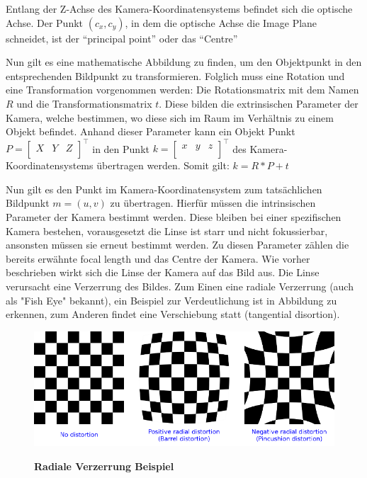 Entlang der Z-Achse des Kamera-Koordinatensystems befindet sich die optische Achse. Der Punkt $(c_x,c_y)$, in dem die optische Achse die Image Plane schneidet, ist der "`principal point"' oder das "`Centre"' \autocite[8]{Medioni:2004:ETC:993884}

Nun gilt es eine mathematische Abbildung zu finden, um den Objektpunkt in den entsprechenden Bildpunkt zu transformieren. Folglich muss eine Rotation und eine Transformation vorgenommen werden:
Die Rotationsmatrix mit dem Namen $R$ und die Transformationsmatrix $t$. Diese bilden die extrinsischen Parameter der Kamera, welche bestimmen, wo diese sich im Raum im Verhältnis zu einem Objekt befindet. Anhand dieser Parameter kann ein  Objekt Punkt $P = \begin{bmatrix}X & Y& Z \\\end{bmatrix}^\intercal$ in den Punkt $ k = \begin{bmatrix}x & y& z \\\end{bmatrix}^\intercal$ des Kamera-Koordinatensystems übertragen werden. Somit gilt: 
$k = R * P + t$ 

Nun gilt es den Punkt im Kamera-Koordinatensystem zum tatsächlichen Bildpunkt $m=(u,v)$ zu übertragen. Hierfür müssen die intrinsischen Parameter der Kamera bestimmt werden. Diese bleiben bei einer spezifischen Kamera bestehen, vorausgesetzt die Linse ist starr und nicht fokussierbar, ansonsten müssen sie erneut bestimmt werden.
Zu diesen Parameter zählen die bereits erwähnte focal length und das Centre der Kamera. Wie vorher beschrieben wirkt sich die Linse der Kamera auf das Bild aus. Die Linse verursacht eine Verzerrung des Bildes. Zum Einen eine radiale Verzerrung (auch als "Fish Eye" bekannt), ein Beispiel zur Verdeutlichung ist in Abbildung  zu erkennen, zum Anderen findet eine Verschiebung statt (tangential disortion).

\begin{figure}
\includegraphics[width=\textwidth]{media/distortion_examples}\\
\caption{\textbf{Radiale Verzerrung Beispiel \autocite{OpencvCamera2016}}
}
\label{Fig:radialdistortion}
\end{figure}

